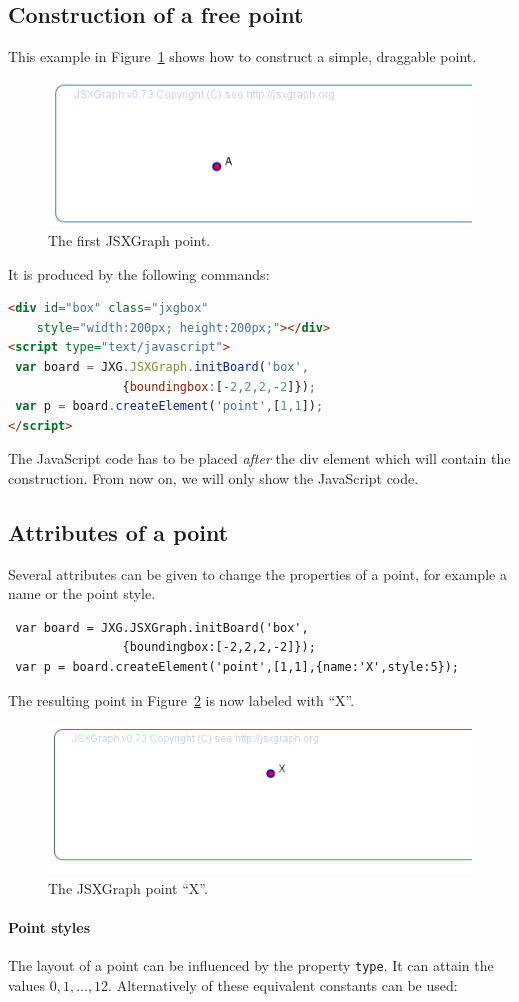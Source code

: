 \documentclass[a4paper,nols]{tufte-book}
\begin{document}
\subsection{Construction of a free point}
This example in Figure~\ref{fig:2} shows how to construct a simple, draggable point. 
\begin{figure}[htb]
\centerline{\includegraphics[width=0.4\linewidth]{images/b3.png}}
\caption{The first JSXGraph point.}\label{fig:2}
\end{figure}
It is produced by the following commands:
\begin{lstlisting}[language=html]
<div id="box" class="jxgbox" 
    style="width:200px; height:200px;"></div>
<script type="text/javascript">
 var board = JXG.JSXGraph.initBoard('box', 
                {boundingbox:[-2,2,2,-2]});
 var p = board.createElement('point',[1,1]);
</script>
\end{lstlisting}

The JavaScript code has to be placed {\sl after} the div element which will contain the construction. From now on, we will only show the JavaScript code. 

\subsection{Attributes of a point}
Several attributes can be given to change the properties of a point, for example a name or the point style. 
\begin{lstlisting}
 var board = JXG.JSXGraph.initBoard('box', 
                {boundingbox:[-2,2,2,-2]});
 var p = board.createElement('point',[1,1],{name:'X',style:5});
\end{lstlisting}
The resulting point in Figure~\ref{fig:3} is now labeled with ``X''.
\begin{figure}[htb]
\centerline{\includegraphics[width=0.4\linewidth]{images/b4.png}}
\caption{The JSXGraph point ``X''.}\label{fig:3}
\end{figure}

\paragraph{Point styles}
The layout of a point can be influenced by the property \lstinline|type|. It can attain the values $0,1,\ldots,12$. 
Alternatively of these equivalent constants can be used:
\end{document}
